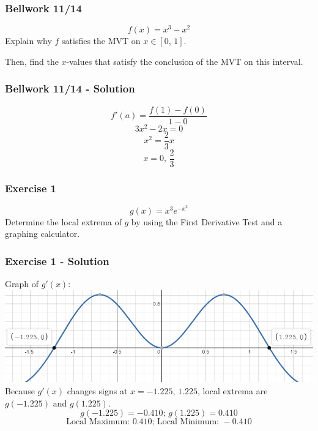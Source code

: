 \documentclass[12pt]{beamer}
\begin{document}
\begin{frame}
	\frametitle{Bellwork 11/14}
	\initclock

	\vfill
	\vfill
	\vfill
	\LARGE
	\[f(x)=x^3-x^2\]
	\vfill
	\vfill
	\vfill
	\large
	Explain why $f$ satisfies the MVT on $x\in[0\text{, }1]$.\par
	\vfill
	Then, find the $x$-values that satisfy the conclusion of the MVT on this interval.
	\vfill
	\vfill
	\vfill
	\vfill
	\vfill
	\vfill

	\small
	\crono
\end{frame}
\begin{frame}
	\frametitle{Bellwork 11/14 - Solution}

	\large
	\[f'(a)=\frac{f(1)-f(0)}{1-0}\]
	\[3x^2-2x=0\]
	\[x^2=\frac{2}{3}x\]
	\[\boxed{x=0\text{, }\frac{2}{3}}\]
\end{frame}
\begin{frame}
	\frametitle{Exercise 1}

	\vfill
	\vfill
	\vfill
	\Large
	\[g(x)=x^3e^{-x^2}\]
	\vfill
	Determine the local extrema of $g$ by using the First Derivative Test and a graphing calculator.
	\vfill
	\vfill
	\vfill
\end{frame}
\begin{frame}
	\frametitle{Exercise 1 - Solution}

	\large
	Graph of $g'(x)$:
	\includegraphics[scale=0.5]{exercise_1_solution_graph.png}
	\vfill
	\small
	Because $g'(x)$ changes signs at $x=-1.225\text{, }1.225$, local extrema are $g(-1.225)$ and $g(1.225)$.
	\[g(-1.225)=-0.410\text{; }g(1.225)=0.410\]
	\[\boxed{\text{Local Maximum: }0.410\text{; Local Minimum: }-0.410}\]
\end{frame}
\end{document}
